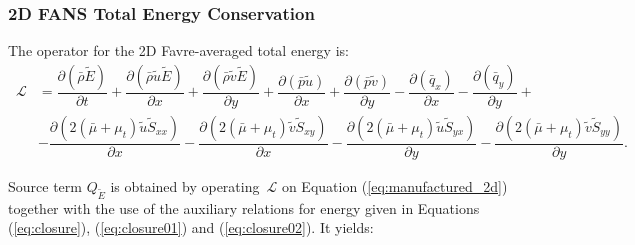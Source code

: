 \documentclass[10pt]{article}
\newcommand{\Diff}[2] {\dfrac{\partial( #1)}{\partial #2}}
\newcommand{\Lo}{\,\mathcal{L}}
\newcommand{\brho}{\bar{\rho}}
\newcommand{\bp}{\bar{p}}
\newcommand{\bq}{\bar{q}}
\newcommand{\tu}{\tilde{u}}
\newcommand{\tv}{\tilde{v}}
\newcommand{\tS}{\tilde{S}}
\newcommand{\tE}{\tilde{E}}
\newcommand{\bmu}{\bar{\mu}}
\begin{document}
\subsubsection{2D FANS Total Energy Conservation}

The operator for the 2D  Favre-averaged total energy is:
\begin{equation*}
\begin{split}
\Lo&=  \Diff{\brho \tE }{t}+ \Diff{\brho \tu \tE }{x}+\Diff{\brho \tv \tE}{y}+\Diff{\bp\tu}{x} +\Diff{\bp\tv}{y} - \Diff{\bq_x}{x} -\Diff{\bq_y}{y} +\\
  &-\Diff{2(\bmu+\mu_t)\tu \tS_{xx}}{x}-\Diff{2(\bmu+\mu_t)\tv \tS_{xy}}{x}-\Diff{2(\bmu+\mu_t) \tu \tS_{yx}}{y}-\Diff{2(\bmu+\mu_t)\tv \tS_{yy}}{y}.
\end{split}
\end{equation*}

Source term $Q_{\tE}$ is obtained by operating $\Lo$ on Equation  (\ref{eq:manufactured_2d}) together with the use of the  auxiliary relations for energy given in Equations (\ref{eq:closure}), (\ref{eq:closure01}) and (\ref{eq:closure02}). It yields:
\end{document}
